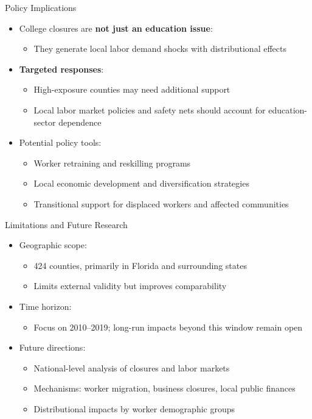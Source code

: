 \documentclass[aspectratio=169]{beamer}
\begin{document}
\begin{frame}{Policy Implications}
  \begin{itemize}
    \item College closures are \textbf{not just an education issue}:
      \begin{itemize}
        \item They generate local labor demand shocks with distributional effects
      \end{itemize}
    \item \textbf{Targeted responses}:
      \begin{itemize}
        \item High-exposure counties may need additional support
        \item Local labor market policies and safety nets should account for education-sector dependence
      \end{itemize}
    \item Potential policy tools:
      \begin{itemize}
        \item Worker retraining and reskilling programs
        \item Local economic development and diversification strategies
        \item Transitional support for displaced workers and affected communities
      \end{itemize}
  \end{itemize}
\end{frame}

\begin{frame}{Limitations and Future Research}
  \begin{itemize}
    \item Geographic scope:
      \begin{itemize}
        \item 424 counties, primarily in Florida and surrounding states
        \item Limits external validity but improves comparability
      \end{itemize}
    \item Time horizon:
      \begin{itemize}
        \item Focus on 2010--2019; long-run impacts beyond this window remain open
      \end{itemize}
    \item Future directions:
      \begin{itemize}
        \item National-level analysis of closures and labor markets
        \item Mechanisms: worker migration, business closures, local public finances
        \item Distributional impacts by worker demographic groups
      \end{itemize}
  \end{itemize}
\end{frame}
\end{document}
